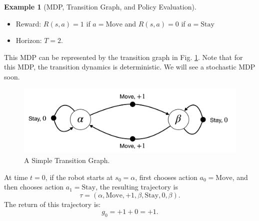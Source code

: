 \documentclass[
]{book}
\theoremstyle{definition}
\theoremstyle{definition}
\newtheorem{example}{Example}[chapter]
\theoremstyle{definition}
\theoremstyle{definition}
\theoremstyle{remark}
\begin{document}
\begin{example}[MDP, Transition Graph, and Policy Evaluation]
\begin{itemize}
\item
  Reward: \(R(s,a)=1\) if \(a = \text{Move}\) and \(R(s,a)=0\) if \(a = \text{Stay}\)
\item
  Horizon: \(T=2\).
\end{itemize}

This MDP can be represented by the transition graph in Fig. \ref{fig:mdp-robot-transition-graph}. Note that for this MDP, the transition dynamics is deterministic. We will see a stochastic MDP soon.

\begin{figure}

{\centering \includegraphics[width=0.9\linewidth]{images/MDP/robot-mdp-graph} 

}

\caption{A Simple Transition Graph.}\label{fig:mdp-robot-transition-graph}
\end{figure}

At time \(t=0\), if the robot starts at \(s_0 = \alpha\), first chooses action \(a_0 = \text{Move}\), and then chooses action \(a_1 = \text{Stay}\), the resulting trajectory is
\[
\tau = (\alpha, \text{Move}, +1, \beta, \text{Stay}, 0,  \beta).
\]
The return of this trajectory is:
\[
g_0 = +1 + 0 = +1.
\]


\end{example}
\end{document}
